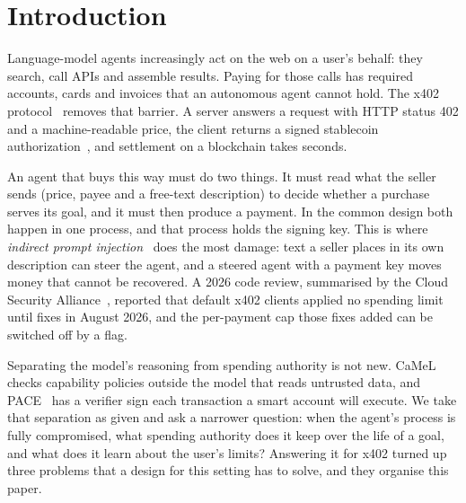 \section{Introduction}

Language-model agents increasingly act on the web on a user's behalf: they search, call APIs and
assemble results. Paying for those calls has required accounts, cards and invoices that an
autonomous agent cannot hold. The x402 protocol~\cite{x402} removes that barrier. A server answers a
request with HTTP status 402 and a machine-readable price, the client returns a signed stablecoin
authorization~\cite{eip3009}, and settlement on a blockchain takes seconds.

An agent that buys this way must do two things. It must read what the seller sends (price, payee and
a free-text description) to decide whether a purchase serves its goal, and it must then produce a
payment. In the common design both happen in one process, and that process holds the signing
key. This is where \emph{indirect prompt injection}~\cite{greshake2023} does the most damage: text a
seller places in its own description can steer the agent, and a steered agent with a payment key
moves money that cannot be recovered. A 2026 code review, summarised by the Cloud Security
Alliance~\cite{csa2026}, reported that default x402 clients applied no spending limit until fixes in
August 2026, and the per-payment cap those fixes added can be switched off by a flag.

Separating the model's reasoning from spending authority is not new. CaMeL~\cite{camel} checks
capability policies outside the model that reads untrusted data, and PACE~\cite{pace} has a verifier
sign each transaction a smart account will execute. We take that separation as given and ask a
narrower question: when the agent's process is fully compromised, what spending authority does it keep
over the life of a goal, and what does it learn about the user's limits? Answering it for x402 turned
up three problems that a design for this setting has to solve, and they organise this paper.

